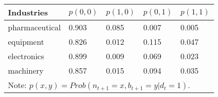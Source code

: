 \begin{tabular}{lllll}
\hline\hline
Industries     & $p(0,0)$& $p(1,0)$& $p(0,1)$ & $p(1,1)$ \\
\hline\hline
pharmaceutical & 0.903 & 0.085 & 0.007 & 0.005  \\
equipment      & 0.826 & 0.012 & 0.115 & 0.047 \\
electronics    & 0.899 & 0.009 & 0.069 & 0.023 \\
machinery      & 0.857 & 0.015 & 0.094 & 0.035 \\
\hline\hline 
\multicolumn{5}{l}{\footnotesize Note: $p(x,y)=Prob(n_{t+1}=x, b_{t+1}=y|d_{t}=1)$.}
\end{tabular}